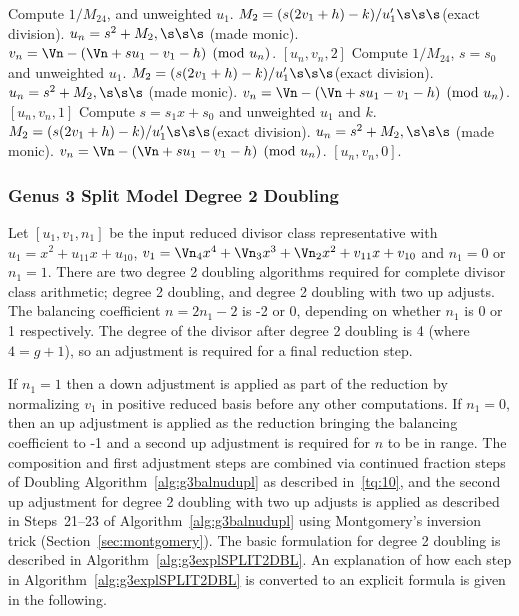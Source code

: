 \begin{subroutine}[htbp]
\begin{algorithmic} [1]
                \Else \hspace{2pt} Compute $1/M_{24}$, and unweighted $u_1$.
                    \State $M_2 = (s(2v_1 + h) - k)/u'_1 \s\s\s $(exact division).
                    \State $u_n = s^2 + M_2, \s\s\s $ (made monic).
                    \State $v_n = \Vn - (\Vn + su_1 - v_1 - h) \pmod{u_n}$.
                    \State \Return $[u_n,v_n,2]$
                \EndIf
            \EndIf
            \State Compute $1/M_{24}$, $s = s_0$ and unweighted $u_1$.
            \State $M_2 = (s(2v_1 + h) - k)/u'_1 \s\s\s $(exact division).
            \State $u_n = s^2 + M_2, \s\s\s $ (made monic).
            \State $v_n = \Vn - (\Vn + su_1 - v_1 - h) \pmod{u_n}$.
            \State \Return $[u_n,v_n,1]$
        \EndIf
    \EndIf
    \State Compute $s = s_1x + s_0$ and unweighted $u_1$ and $k$.
    \State $M_2 = (s(2v_1 + h) - k)/u'_1 \s\s\s $(exact division).
    \State $u_n = s^2 + M_2, \s\s\s $ (made monic).
    \State $v_n = \Vn - (\Vn + su_1 - v_1 - h) \pmod{u_n}$.
    \State \Return $[u_n,v_n,0]$.
\EndIf
\end{algorithmic}
\end{subroutine}


\newpage
\subsubsection{Genus 3 Split Model Degree 2 Doubling}
Let $[u_1,v_1,n_1]$ be the input reduced divisor class representative with $u_1
= x^2 + u_{11}x + u_{10}$, $v_1 = \Vn_4x^4 + \Vn_3x^3 + \Vn_2x^2 + v_{11}x +
v_{10}$ and $n_1 = 0$ or $n_1 = 1$. There are two degree 2 doubling algorithms
required for complete divisor class arithmetic; degree 2 doubling, and degree 2
doubling with two up adjusts. The balancing coefficient $n = 2n_1 - 2$ is -2 or
0, depending on whether $n_1$ is 0 or 1 respectively. The degree of the divisor
after degree 2 doubling is 4 (where $4 = g + 1$), so an adjustment is required
for a final reduction step. 

If $n_1 = 1$ then a down adjustment is applied as part of the reduction by
normalizing $v_1$ in positive reduced basis before any other computations. If
$n_1=0$, then an up adjustment is applied as the reduction bringing the
balancing coefficient to -1 and a second up adjustment is required for $n$ to be
in range. The composition and first adjustment steps are combined via continued
fraction steps of Doubling Algorithm~\ref{alg:g3balnudupl} as described
in~\ref{tq:10}, and the second up adjustment for degree 2 doubling with two up
adjusts is applied as described in Steps~21--23 of
Algorithm~\ref{alg:g3balnudupl} using Montgomery's inversion trick
(Section~\ref{sec:montgomery}). The basic formulation for degree 2 doubling is
described in Algorithm~\ref{alg:g3explSPLIT2DBL}. An explanation of how each
step in Algorithm~\ref{alg:g3explSPLIT2DBL} is converted to an explicit formula
is given in the following.

